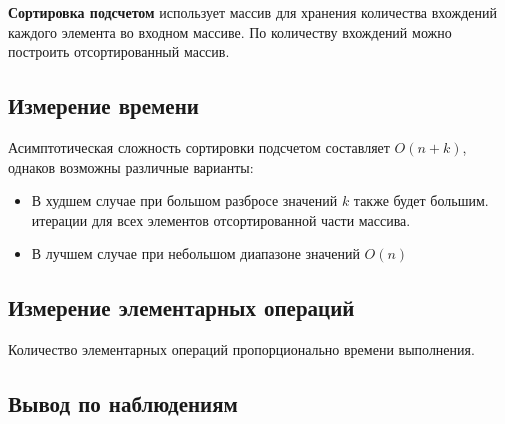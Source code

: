 \documentclass[11pt]{article}
\begin{document}
\textbf{Сортировка подсчетом} использует массив для хранения количества вхождений каждого
элемента во входном массиве. По количеству вхождений можно построить отсортированный массив.

\setcounter{subsection}{0}
\subsection{Измерение времени}

\begin{center}
\end{center}
{ \hspace*{\fill} }

\begin{center}
\end{center}
{ \hspace*{\fill} }

Асимптотическая сложность сортировки подсчетом составляет $O(n + k)$, однаков возможны различные варианты:
\begin{itemize}
    \item В худшем случае при большом разбросе значений $k$ также будет большим.
          итерации для всех элементов отсортированной части массива.
    \item В лучшем случае при небольшом диапазоне значений $O(n)$
\end{itemize}

\subsection{Измерение элементарных операций}

\begin{center}
\end{center}
{ \hspace*{\fill} }

\begin{center}
\end{center}
{ \hspace*{\fill} }

Количество элементарных операций пропорционально времени выполнения.

\subsection{Вывод по наблюдениям}
\end{document}
